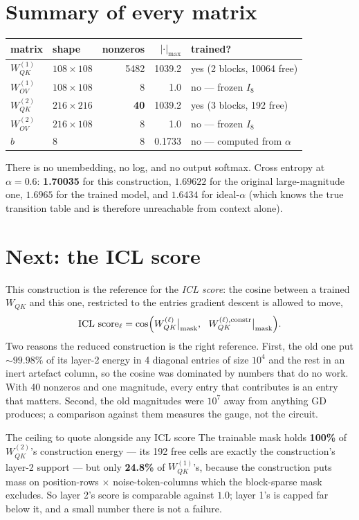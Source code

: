 \documentclass[11pt]{article}
\newcommand{\Wqk}{W_{QK}}
\newcommand{\Wov}{W_{OV}}
\begin{document}
\section{Summary of every matrix}

\begin{center}\small
\begin{tabular}{@{}llrrl@{}}
\toprule
matrix & shape & nonzeros & $|\cdot|_{\max}$ & trained? \\
\midrule
$\Wqk^{(1)}$ & $108\times108$ & 5482 & 1039.2 & yes (2 blocks, 10064 free) \\
$\Wov^{(1)}$ & $108\times108$ & 8 & 1.0 & no --- frozen $I_8$ \\
$\Wqk^{(2)}$ & $216\times216$ & \textbf{40} & 1039.2 & yes (3 blocks, 192 free) \\
$\Wov^{(2)}$ & $216\times108$ & 8 & 1.0 & no --- frozen $I_8$ \\
\midrule
$b$ & $8$ & 8 & 0.1733 & no --- computed from $\alpha$ \\
\bottomrule
\end{tabular}
\end{center}

There is no unembedding, no log, and no output softmax. Cross entropy at $\alpha=0.6$:
\textbf{1.70035} for this construction, $1.69622$ for the original large-magnitude one,
$1.6965$ for the trained model, and $1.6434$ for ideal-$\alpha$ (which knows the true transition
table and is therefore unreachable from context alone).

\section{Next: the ICL score}

This construction is the reference for the \emph{ICL score}: the cosine between a trained
$\Wqk$ and this one, restricted to the entries gradient descent is allowed to move,
\[
\text{ICL score}_\ell=\cos\Bigl(\Wqk^{(\ell)}\big|_{\text{mask}},\ \
\Wqk^{(\ell),\text{constr}}\big|_{\text{mask}}\Bigr).
\]
Two reasons the reduced construction is the right reference. First, the old one put
$\sim99.98\%$ of its layer-2 energy in 4 diagonal entries of size $10^4$ and the rest in an inert
artefact column, so the cosine was dominated by numbers that do no work. With 40 nonzeros and one
magnitude, every entry that contributes is an entry that matters. Second, the old magnitudes were
$10^7$ away from anything GD produces; a comparison against them measures the gauge, not the
circuit.

\begin{warningbox}{The ceiling to quote alongside any ICL score}
The trainable mask holds \textbf{100\%} of $\Wqk^{(2)}$'s construction energy --- its 192 free
cells are exactly the construction's layer-2 support --- but only \textbf{24.8\%} of
$\Wqk^{(1)}$'s, because the construction puts mass on position-rows $\times$ noise-token-columns
which the block-sparse mask excludes. So layer 2's score is comparable against $1.0$; layer 1's is
capped far below it, and a small number there is not a failure.
\end{warningbox}
\end{document}
